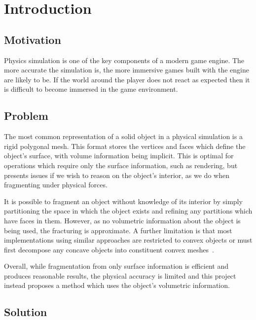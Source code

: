 \chapter{Introduction}

\section{Motivation}

Physics simulation is one of the key components of a modern game engine. The more accurate the simulation is, the more immersive games built with the engine are likely to be. If the world around the player does not react as expected then it is difficult to become immersed in the game environment.

\section{Problem}

\label{sect:prob}

The most common representation of a solid object in a physical simulation is a rigid polygonal mesh. This format stores the vertices and faces which define the object's surface, with volume information being implicit. This is optimal for operations which require only the surface information, such as rendering, but presents issues if we wish to reason on the object's interior, as we do when fragmenting under physical forces.

It is possible to fragment an object without knowledge of its interior by simply partitioning the space in which the object exists and refining any partitions which have faces in them. However, as no volumetric information about the object is being used, the fracturing is approximate. A further limitation is that most implementations using similar approaches are restricted to convex objects or must first decompose any concave objects into constituent convex meshes~\cite{Muller:2013:RTD:2461912.2461934}.

Overall, while fragmentation from only surface information is efficient and produces reasonable results, the physical accuracy is limited and this project instead proposes a method which uses the object's volumetric information.

\section{Solution}


